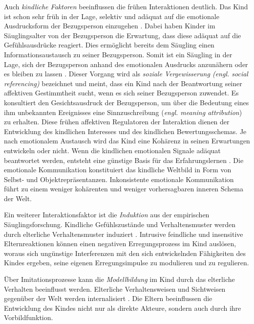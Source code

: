 Auch \textit{kindliche Faktoren} beeinflussen die frühen Interaktionen deutlich. Das Kind ist schon sehr früh in der Lage, selektiv und adäquat auf die emotionale Ausdrucksform der Bezugsperson einzugehen \cite{Harris1994}. Dabei haben Kinder im Säuglingsalter von der Bezugsperson die Erwartung, dass diese adäquat auf die Gefühlsausdrücke reagiert. Dies ermöglicht bereits dem Säugling einen Informationsaustausch zu seiner Bezugsperson. Somit ist ein Säugling in der Lage, sich der Bezugsperson anhand des emotionalen Ausdrucks anzunähern oder es bleiben zu lassen \cite{Resch1999}. Dieser Vorgang wird als \textit{soziale Vergewisserung (\textit{engl. social referencing})} bezeichnet und meint, dass ein Kind nach der Beantwortung seiner affektiven Gestimmtheit sucht, wenn es sich seiner Bezugsperson zuwendet. Es konsultiert den Gesichtsausdruck der Bezugsperson, um über die Bedeutung eines ihm unbekannten Ereignisses eine Sinnzuschreibung (\textit{engl. meaning attribution}) zu erhalten. Diese frühen affektiven Regulatoren der Interaktion dienen der Entwicklung des kindlichen Interesses und des kindlichen Bewertungsschemas. Je nach emotionalem Austausch wird das Kind eine Kohärenz in seinen Erwartungen entwickeln oder nicht. Wenn die kindlichen emotionalen Signale adäquat beantwortet werden, entsteht eine günstige Basis für das Erfahrungslernen \cite[S.~95]{Resch1999}. Die emotionale Kommunikation konstituiert das kindliche Weltbild in Form von Selbst- und Objektrepräsentanzen. Inkonsistente emotionale Kommunikation führt zu einem weniger kohärenten und weniger vorhersagbaren inneren Schema der Welt. 

Ein weiterer Interaktionsfaktor ist die \textit{Induktion} aus der empirischen Säuglingsforschung. Kindliche Gefühlszustände und Verhaltensmuster werden durch elterliche Verhaltensmuster induziert \cite{Cummings1994}. Intrusive feindliche und insensitive Elternreaktionen können einen negativen Erregungsprozess im Kind auslösen, woraus sich ungünstige Interferenzen mit den sich entwickelnden Fähigkeiten des Kindes ergeben, seine eigenen Erregungsimpulse zu modulieren und zu regulieren.  

Über Imitationsprozesse kann die \textit{Modellbildung} im Kind durch das elterliche Verhalten beeinflusst werden. Elterliche Verhaltensweisen und Sichtweisen gegenüber der Welt werden internalisiert \cite{Resch1999}. Die Eltern beeinflussen die Entwicklung des Kindes nicht nur als direkte Akteure, sondern auch durch ihre Vorbildfunktion. 

